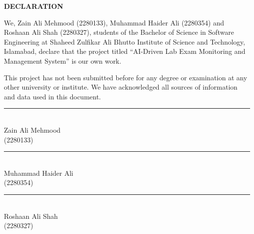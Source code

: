 \newpage
\thispagestyle{empty}
\begin{center}
    {\Huge\textbf{DECLARATION}}
\end{center}
\vspace{1cm}

\begin{onehalfspacing}
We, Zain Ali Mehmood (2280133), Muhammad Haider Ali (2280354) and Roshaan Ali Shah (2280327), students of the Bachelor of Science in Software Engineering at Shaheed Zulfikar Ali Bhutto Institute of Science and Technology, Islamabad, declare that the project titled ``AI-Driven Lab Exam Monitoring and Management System'' is our own work.

This project has not been submitted before for any degree or examination at any other university or institute. We have acknowledged all sources of information and data used in this document.\par
\end{onehalfspacing}

\vspace{2cm}

\noindent
\begin{minipage}{0.45\textwidth}
\centering
\rule{6cm}{0.4pt}\\[4pt]
Zain Ali Mehmood\\
(2280133)
\end{minipage}
\hfill
\begin{minipage}{0.45\textwidth}
\centering
\rule{6cm}{0.4pt}\\[4pt]
Muhammad Haider Ali\\
(2280354)
\end{minipage}

\vspace{1.8cm}

\begin{center}
\begin{minipage}{0.45\textwidth}
\centering
\rule{6cm}{0.4pt}\\[4pt]
Roshaan Ali Shah\\
(2280327)
\end{minipage}
\end{center}
